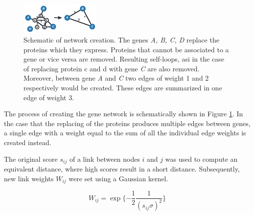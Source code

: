 \documentclass[10pt,conference,compsocconf]{IEEEtran}
\begin{document}
\begin{figure}
	\centering
	\includegraphics[width=0.35\textwidth]{network.png}
	\caption{Schematic of network creation.  The genes \textit{A, B, C, D} replace the proteins which they express. Proteins that cannot be associated to a gene or vice versa are removed. Resulting self-loops, asi in the case of replacing protein c and d with gene \textit{C} are also removed. Moreover, between gene \textit{A} and \textit{C} two edges of weight 1 and 2 respectively would be created. These edges are summarized in one edge of weight 3. }
	\label{fig:network_creation}
\end{figure}
The process of creating the gene network is schematically shown in Figure \ref{fig:network_creation}. In the case that the replacing of the proteins produces multiple edges between genes, a single edge with a weight equal to the sum of all the individual edge weights is created instead.
\par
The original score $s_{ij}$ of a link between nodes $i$ and $j$ was used to compute an equivalent distance, where high scores result in a short distance. Subsequently, new link weights $W_{ij}$ were set using a Gaussian kernel.

\begin{equation}
W_{ij} = \exp \{- \frac{1}{2}\frac{1}{(s_{ij} \sigma)^2}\}
\end{equation}
\end{document}
